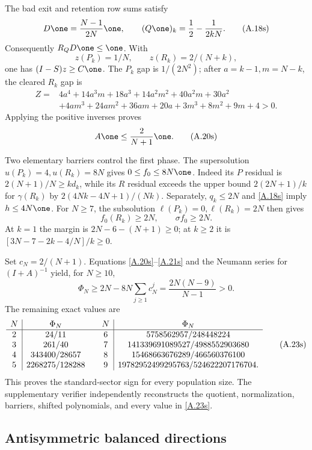 The bad exit and retention row sums satisfy
\[
 D\one={\frac{N-1}{2N}}\one,\qquad
 (Q\one)_k={\frac{1}{2}}-{\frac{1}{2kN}}.                         \tag{A.18s}\label{A.18s}
\]
Consequently $R_QD\one\le\one$.  With
\[
 z(P_k)=1/N,\qquad z(R_k)=2/(N+k),
\]
one has $(I-S)z\ge C\one$.  The $P_k$ gap is $1/(2N^2)$;
after $a=k-1,m=N-k$, the cleared $R_k$ gap is
\[
\begin{aligned}
Z={}&4a^4+14a^3m+18a^3+14a^2m^2+40a^2m+30a^2\\
 &+4am^3+24am^2+36am+20a+3m^3+8m^2+9m+4>0.
\end{aligned}                                               \tag{A.19s}\label{A.19s}
\]
Applying the positive inverses proves
\[
 A\one\le {\frac{2}{ N+1}}\one.                              \tag{A.20s}\label{A.20s}
\]

Two elementary barriers control the first phase.  The supersolution
$u(P_k)=4,u(R_k)=8N$ gives $0\le f_0\le8N\one$.  Indeed its
$P$ residual is $2(N+1)/N\ge kd_k$, while its $R$ residual exceeds the
upper bound $2(2N+1)/k$ for $\gamma(R_k)$ by
$2(4Nk-4N+1)/(Nk)$.  Separately, $q_k\le2N$ and
\eqref{A.18s} imply $h\le4N\one$.  For $N\ge7$, the subsolution
$\ell(P_k)=0,\ell(R_k)=2N$ then gives
\[
 f_0(R_k)\ge2N,\qquad \sigma f_0\ge2N.                    \tag{A.21s}\label{A.21s}
\]
At $k=1$ the margin is $2N-6-(N+1)\ge0$; at $k\ge2$ it is
$[3N-7-2k-4/N]/k\ge0$.

Set $c_N=2/(N+1)$.  Equations \eqref{A.20s}--\eqref{A.21s} and the
Neumann series for $(I+A)^{-1}$ yield, for $N\ge10$,
\[
 \Phi_N\ge2N-8N\sum_{j\ge1}c_N^j
 ={\frac{2N(N-9)}{ N-1}}>0.                                   \tag{A.22s}\label{A.22s}
\]
The remaining exact values are
\[
\begin{array}{c|c@{\qquad}c|c}
N&\Phi_N&N&\Phi_N\\ \hline
2&24/11&6&5758562957/248448224\\
3&261/40&7&141339691089527/4988552903680\\
4&343400/28657&8&15468663676289/466560376100\\
5&2268275/128288&9&19782952499295763/524622207176704.
\end{array}                                                \tag{A.23s}\label{A.23s}
\]
This proves the standard-sector sign for every population size.  The supplementary
verifier independently reconstructs the quotient, normalization, barriers,
shifted polynomials, and every value in \eqref{A.23s}.

\subsection{Antisymmetric balanced directions}

